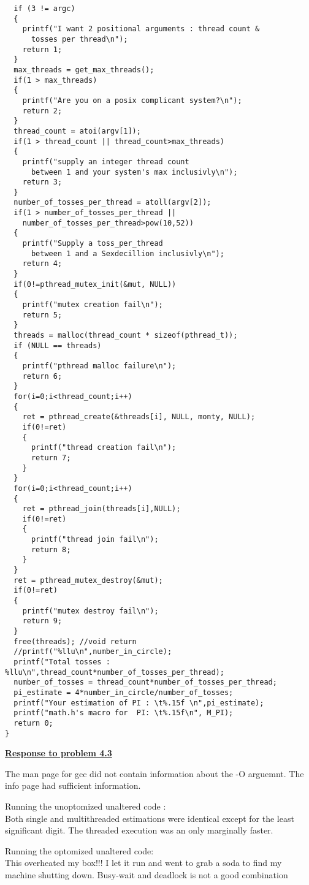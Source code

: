 \documentclass{article}
\begin{document}
\begin{lstlisting}
  if (3 != argc)
  {
    printf("I want 2 positional arguments : thread count &
	  tosses per thread\n");
    return 1;
  }
  max_threads = get_max_threads();
  if(1 > max_threads)
  {
    printf("Are you on a posix complicant system?\n");
    return 2;
  }
  thread_count = atoi(argv[1]);
  if(1 > thread_count || thread_count>max_threads)
  {
    printf("supply an integer thread count 
      between 1 and your system's max inclusivly\n");
    return 3;
  }
  number_of_tosses_per_thread = atoll(argv[2]);
  if(1 > number_of_tosses_per_thread || 
    number_of_tosses_per_thread>pow(10,52))
  {
    printf("Supply a toss_per_thread
      between 1 and a Sexdecillion inclusivly\n");
    return 4;
  }
  if(0!=pthread_mutex_init(&mut, NULL))
  {
    printf("mutex creation fail\n");
    return 5;
  }
  threads = malloc(thread_count * sizeof(pthread_t));
  if (NULL == threads)
  {
    printf("pthread malloc failure\n");
    return 6;
  }
  for(i=0;i<thread_count;i++)
  {
    ret = pthread_create(&threads[i], NULL, monty, NULL);
    if(0!=ret)
    {
      printf("thread creation fail\n");
      return 7;
    }
  }
  for(i=0;i<thread_count;i++)
  {
    ret = pthread_join(threads[i],NULL);
    if(0!=ret)
    {
      printf("thread join fail\n");
      return 8;
    }
  }
  ret = pthread_mutex_destroy(&mut);  
  if(0!=ret)
  {
    printf("mutex destroy fail\n");
    return 9;
  }
  free(threads); //void return
  //printf("%llu\n",number_in_circle);
  printf("Total tosses : %llu\n",thread_count*number_of_tosses_per_thread);
  number_of_tosses = thread_count*number_of_tosses_per_thread;
  pi_estimate = 4*number_in_circle/number_of_tosses;
  printf("Your estimation of PI : \t%.15f \n",pi_estimate);
  printf("math.h's macro for  PI: \t%.15f\n", M_PI);
  return 0;
}

\end{lstlisting}

\bigskip

\noindent \textbf{\underline{Response to problem 4.3}}

\bigskip

The man page for gcc did not contain information about the -O arguemnt. The info page
had sufficient information. 

Running the unoptomized unaltered code : \\
Both single and multithreaded estimations were identical except for
the least significant digit. The threaded execution was an only
marginally faster.

Running the optomized unaltered code: \\
This overheated my box!!! I let it run and went to grab a soda to
find my machine shutting down. Busy-wait and deadlock is not a good combination
\end{document}

